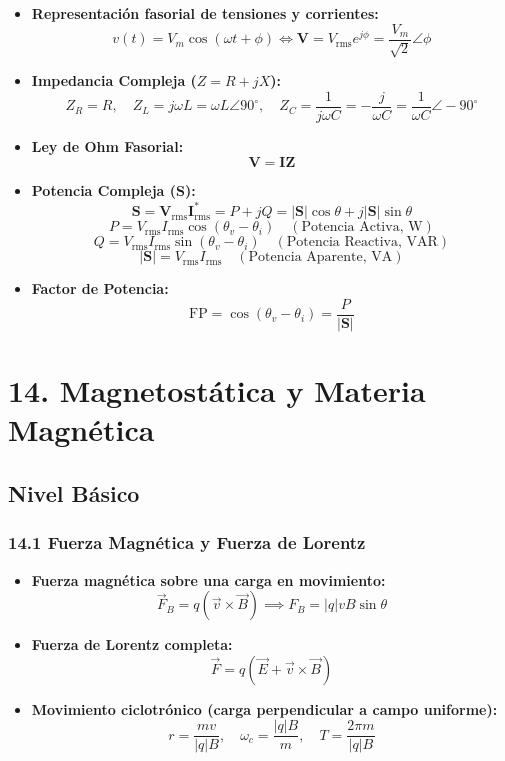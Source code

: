 \documentclass[11pt,a4paper]{article}
\begin{document}
\begin{itemize}
  \item \textbf{Representación fasorial de tensiones y corrientes:}
  \[
    v(t) = V_m \cos(\omega t + \phi) \iff \mathbf{V} = V_{\text{rms}} e^{j\phi} = \frac{V_m}{\sqrt{2}} \angle \phi
  \]
  \item \textbf{Impedancia Compleja ($Z = R + jX$):}
  \[
    Z_R = R, \quad Z_L = j\omega L = \omega L \angle 90^\circ, \quad Z_C = \frac{1}{j\omega C} = -\frac{j}{\omega C} = \frac{1}{\omega C} \angle -90^\circ
  \]
  \item \textbf{Ley de Ohm Fasorial:}
  \[
    \mathbf{V} = \mathbf{I} \mathbf{Z}
  \]
  \item \textbf{Potencia Compleja ($\mathbf{S}$):}
  \[
    \mathbf{S} = \mathbf{V}_{\text{rms}} \mathbf{I}_{\text{rms}}^* = P + j Q = |\mathbf{S}| \cos\theta + j |\mathbf{S}| \sin\theta
  \]
  \[
    P = V_{\text{rms}} I_{\text{rms}} \cos(\theta_v - \theta_i) \quad (\text{Potencia Activa, W})
  \]
  \[
    Q = V_{\text{rms}} I_{\text{rms}} \sin(\theta_v - \theta_i) \quad (\text{Potencia Reactiva, VAR})
  \]
  \[
    |\mathbf{S}| = V_{\text{rms}} I_{\text{rms}} \quad (\text{Potencia Aparente, VA})
  \]
  \item \textbf{Factor de Potencia:}
  \[
    \text{FP} = \cos(\theta_v - \theta_i) = \frac{P}{|\mathbf{S}|}
  \]
\end{itemize}

\section*{14. Magnetostática y Materia Magnética}

\subsection*{Nivel Básico}

\subsubsection*{14.1 Fuerza Magnética y Fuerza de Lorentz}

\begin{itemize}
  \item \textbf{Fuerza magnética sobre una carga en movimiento:}
  \[
    \vec{F}_B = q (\vec{v} \times \vec{B}) \implies F_B = |q| v B \sin\theta
  \]
  \item \textbf{Fuerza de Lorentz completa:}
  \[
    \vec{F} = q (\vec{E} + \vec{v} \times \vec{B})
  \]
  \item \textbf{Movimiento ciclotrónico (carga perpendicular a campo uniforme):}
  \[
    r = \frac{m v}{|q| B}, \quad \omega_c = \frac{|q| B}{m}, \quad T = \frac{2\pi m}{|q| B}
  \]
\end{itemize}
\end{document}
